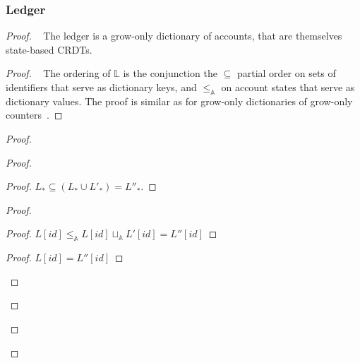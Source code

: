 \documentclass[9pt, oneside]{article}   	%
\begin{document}
\subsubsection{Ledger}
\label{sec:proof:ledger}


\label{th:ledger-crdt}
\begin{proof}
	\pfsketch~ The ledger is a grow-only dictionary of accounts, that are themselves state-based CRDTs.
	
	\begin{proof}
		\pfsketch~ The ordering of $\mathds{L}$ is the conjunction the $\subseteq$ partial order on sets of identifiers that serve as dictionary keys, and $\leq_\mathds{A}$ on account states that serve as dictionary values. The proof is similar as for grow-only dictionaries of grow-only counters~\cite{lavoie2023statebased}.
	\end{proof}
	
	\begin{proof}		
		\begin{proof}
			\begin{proof}
				$L_* \subseteq (L_* \cup L'_*) = L''_*$.
			\end{proof}
			
			\begin{proof}
				\begin{proof}
					$ L[\textit{id}] \leq_\mathds{A} L[\textit{id}] \sqcup_\mathds{A}  L'[\textit{id}]  = L''[\textit{id}]$
				\end{proof}
				
				\begin{proof}
					$L[\textit{id}] = L''[\textit{id}]$
				\end{proof}
			\end{proof}
			

\end{proof}
\end{proof}
\end{proof}
\end{document}
